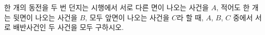 한 개의 동전을 두 번 던지는 시행에서 서로 다른 면이 나오는 사건을 $A$, 적어도 한 개는 뒷면이 나오는 사건을 $B$, 모두 앞면이 나오는 사건을 $C$라 할 때, $A$, $B$, $C$ 중에서 서로 배반사건인 두 사건을 모두 구하시오.
